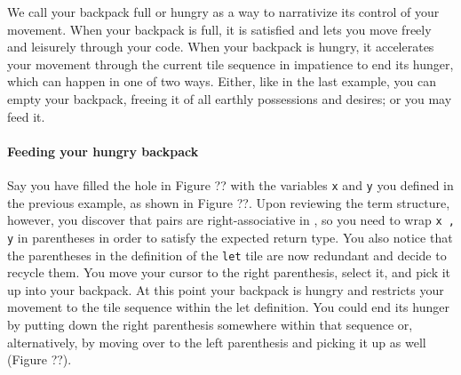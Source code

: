 
We call your backpack full or hungry as a way
to narrativize its control of your movement.
When your backpack is full, it is satisfied
and lets you move freely and leisurely through
your code.
When your backpack is hungry, it accelerates your
movement through the current tile sequence
in impatience to end its hunger, which can happen in one of two ways.
Either, like in the last example, you can empty your backpack,
freeing it of all earthly possessions and desires;
or you may feed it.



\paragraph{Feeding your hungry backpack}
Say you have filled the hole in Figure ?? with
the variables \texttt{x} and \texttt{y} you defined
in the previous example, as shown in Figure ??.
Upon reviewing the term structure, however, you
discover that pairs are right-associative in \tylr,
so you need to wrap \texttt{x , y} in parentheses
in order to satisfy the expected return type.
You also notice that the parentheses in the definition
of the \texttt{let} tile are now redundant
and decide to recycle them.
You move your cursor to the right parenthesis,
select it, and pick it up into your backpack.
At this point your backpack is hungry and restricts
your movement to the tile sequence within the
let definition.
You could end its hunger by putting down
the right parenthesis somewhere within that sequence
or, alternatively, by moving over to the
left parenthesis and picking it up as well (Figure ??).

